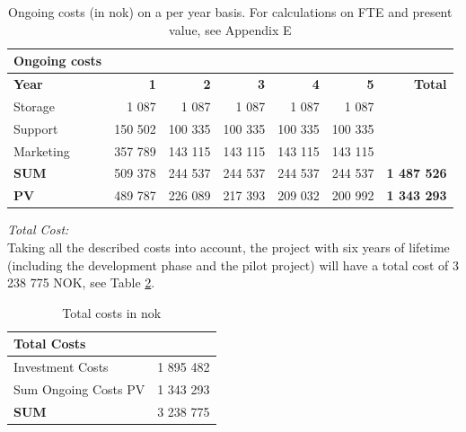 \begin{table}
\centering
\caption[Ongoing costs on a per year basis]{Ongoing costs (in \ac{nok}) on a per year basis. For calculations on FTE and present value, see Appendix E}
    \begin{tabular}{|l|r|r|r|r|r|r|}
        \hline
       \textbf{Ongoing costs}  & & & & & & \\ \hline
      \textbf{Year} & \textbf{1} & \textbf{2} & \textbf{3} & \textbf{4} & \textbf{5} & \textbf{Total}\\ \hline
	   Storage & 1 087 & 1 087 & 1 087 & 1 087 & 1 087 &\\ \hline
	  Support & 150 502 & 100 335 & 100 335 & 100 335 & 100 335 & \\ \hline
	  Marketing & 357 789 & 143 115 & 143 115 & 143 115 & 143 115 & \\ \hline
	   \textbf{SUM} & 509 378 & 244 537 & 244 537 & 244 537 & 244 537 & \textbf{1 487 526} \\ \hline  
	   \textbf{PV} & 489 787 & 226 089 & 217 393 & 209 032 & 200 992 & \textbf{1 343 293}  \\ \hline
    \end{tabular}
    \label{tab:ongoing}
\end{table}
\emph{Total Cost:}\\
Taking all the described costs into account, the project with six years of lifetime (including the development phase and the pilot project) will have a total cost of 3 238 775 NOK, see Table \ref{tab:totalcosts}.

\begin{table}[h]
\centering
\caption[Total costs]{Total costs in \ac{nok}}
\begin{tabular}{|l|r|}
\hline
\textbf{Total Costs} & \\ \hline
Investment Costs & 1 895 482 \\ \hline
Sum Ongoing Costs PV & 1 343 293 \\ \hline
\textbf{SUM} & 3 238 775 \\ \hline
\end{tabular}
\label{tab:totalcosts}
\end{table}

